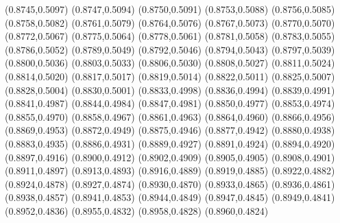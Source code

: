 \PST@Filltriangle(0.8745,0.5097)
\PST@Filltriangle(0.8747,0.5094)
\PST@Filltriangle(0.8750,0.5091)
\PST@Filltriangle(0.8753,0.5088)
\PST@Filltriangle(0.8756,0.5085)
\PST@Filltriangle(0.8758,0.5082)
\PST@Filltriangle(0.8761,0.5079)
\PST@Filltriangle(0.8764,0.5076)
\PST@Filltriangle(0.8767,0.5073)
\PST@Filltriangle(0.8770,0.5070)
\PST@Filltriangle(0.8772,0.5067)
\PST@Filltriangle(0.8775,0.5064)
\PST@Filltriangle(0.8778,0.5061)
\PST@Filltriangle(0.8781,0.5058)
\PST@Filltriangle(0.8783,0.5055)
\PST@Filltriangle(0.8786,0.5052)
\PST@Filltriangle(0.8789,0.5049)
\PST@Filltriangle(0.8792,0.5046)
\PST@Filltriangle(0.8794,0.5043)
\PST@Filltriangle(0.8797,0.5039)
\PST@Filltriangle(0.8800,0.5036)
\PST@Filltriangle(0.8803,0.5033)
\PST@Filltriangle(0.8806,0.5030)
\PST@Filltriangle(0.8808,0.5027)
\PST@Filltriangle(0.8811,0.5024)
\PST@Filltriangle(0.8814,0.5020)
\PST@Filltriangle(0.8817,0.5017)
\PST@Filltriangle(0.8819,0.5014)
\PST@Filltriangle(0.8822,0.5011)
\PST@Filltriangle(0.8825,0.5007)
\PST@Filltriangle(0.8828,0.5004)
\PST@Filltriangle(0.8830,0.5001)
\PST@Filltriangle(0.8833,0.4998)
\PST@Filltriangle(0.8836,0.4994)
\PST@Filltriangle(0.8839,0.4991)
\PST@Filltriangle(0.8841,0.4987)
\PST@Filltriangle(0.8844,0.4984)
\PST@Filltriangle(0.8847,0.4981)
\PST@Filltriangle(0.8850,0.4977)
\PST@Filltriangle(0.8853,0.4974)
\PST@Filltriangle(0.8855,0.4970)
\PST@Filltriangle(0.8858,0.4967)
\PST@Filltriangle(0.8861,0.4963)
\PST@Filltriangle(0.8864,0.4960)
\PST@Filltriangle(0.8866,0.4956)
\PST@Filltriangle(0.8869,0.4953)
\PST@Filltriangle(0.8872,0.4949)
\PST@Filltriangle(0.8875,0.4946)
\PST@Filltriangle(0.8877,0.4942)
\PST@Filltriangle(0.8880,0.4938)
\PST@Filltriangle(0.8883,0.4935)
\PST@Filltriangle(0.8886,0.4931)
\PST@Filltriangle(0.8889,0.4927)
\PST@Filltriangle(0.8891,0.4924)
\PST@Filltriangle(0.8894,0.4920)
\PST@Filltriangle(0.8897,0.4916)
\PST@Filltriangle(0.8900,0.4912)
\PST@Filltriangle(0.8902,0.4909)
\PST@Filltriangle(0.8905,0.4905)
\PST@Filltriangle(0.8908,0.4901)
\PST@Filltriangle(0.8911,0.4897)
\PST@Filltriangle(0.8913,0.4893)
\PST@Filltriangle(0.8916,0.4889)
\PST@Filltriangle(0.8919,0.4885)
\PST@Filltriangle(0.8922,0.4882)
\PST@Filltriangle(0.8924,0.4878)
\PST@Filltriangle(0.8927,0.4874)
\PST@Filltriangle(0.8930,0.4870)
\PST@Filltriangle(0.8933,0.4865)
\PST@Filltriangle(0.8936,0.4861)
\PST@Filltriangle(0.8938,0.4857)
\PST@Filltriangle(0.8941,0.4853)
\PST@Filltriangle(0.8944,0.4849)
\PST@Filltriangle(0.8947,0.4845)
\PST@Filltriangle(0.8949,0.4841)
\PST@Filltriangle(0.8952,0.4836)
\PST@Filltriangle(0.8955,0.4832)
\PST@Filltriangle(0.8958,0.4828)
\PST@Filltriangle(0.8960,0.4824)
